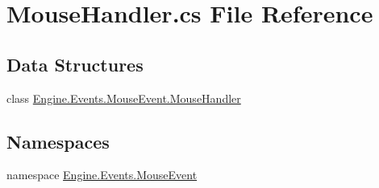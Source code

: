 \hypertarget{a00065}{}\section{Mouse\+Handler.\+cs File Reference}
\label{a00065}
\subsection*{Data Structures}
\begin{DoxyCompactItemize}
\item 
class \hyperlink{a00378}{Engine.\+Events.\+Mouse\+Event.\+Mouse\+Handler}
\end{DoxyCompactItemize}
\subsection*{Namespaces}
\begin{DoxyCompactItemize}
\item 
namespace \hyperlink{a00248}{Engine.\+Events.\+Mouse\+Event}
\end{DoxyCompactItemize}
